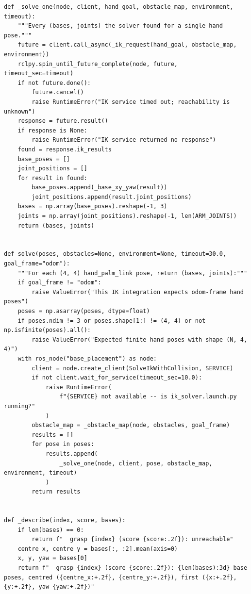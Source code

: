 \documentclass[11pt,a4paper]{book}
\begin{document}
\begin{lstlisting}
def _solve_one(node, client, hand_goal, obstacle_map, environment, timeout):
    """Every (bases, joints) the solver found for a single hand pose."""
    future = client.call_async(_ik_request(hand_goal, obstacle_map, environment))
    rclpy.spin_until_future_complete(node, future, timeout_sec=timeout)
    if not future.done():
        future.cancel()
        raise RuntimeError("IK service timed out; reachability is unknown")
    response = future.result()
    if response is None:
        raise RuntimeError("IK service returned no response")
    found = response.ik_results
    base_poses = []
    joint_positions = []
    for result in found:
        base_poses.append(_base_xy_yaw(result))
        joint_positions.append(result.joint_positions)
    bases = np.array(base_poses).reshape(-1, 3)
    joints = np.array(joint_positions).reshape(-1, len(ARM_JOINTS))
    return (bases, joints)


def solve(poses, obstacles=None, environment=None, timeout=30.0, goal_frame="odom"):
    """For each (4, 4) hand_palm_link pose, return (bases, joints):"""
    if goal_frame != "odom":
        raise ValueError("This IK integration expects odom-frame hand poses")
    poses = np.asarray(poses, dtype=float)
    if poses.ndim != 3 or poses.shape[1:] != (4, 4) or not np.isfinite(poses).all():
        raise ValueError("Expected finite hand poses with shape (N, 4, 4)")
    with ros_node("base_placement") as node:
        client = node.create_client(SolveIkWithCollision, SERVICE)
        if not client.wait_for_service(timeout_sec=10.0):
            raise RuntimeError(
                f"{SERVICE} not available -- is ik_solver.launch.py running?"
            )
        obstacle_map = _obstacle_map(node, obstacles, goal_frame)
        results = []
        for pose in poses:
            results.append(
                _solve_one(node, client, pose, obstacle_map, environment, timeout)
            )
        return results


def _describe(index, score, bases):
    if len(bases) == 0:
        return f"  grasp {index} (score {score:.2f}): unreachable"
    centre_x, centre_y = bases[:, :2].mean(axis=0)
    x, y, yaw = bases[0]
    return f"  grasp {index} (score {score:.2f}): {len(bases):3d} base poses, centred ({centre_x:+.2f}, {centre_y:+.2f}), first ({x:+.2f}, {y:+.2f}, yaw {yaw:+.2f})"



\end{lstlisting}
\end{document}
